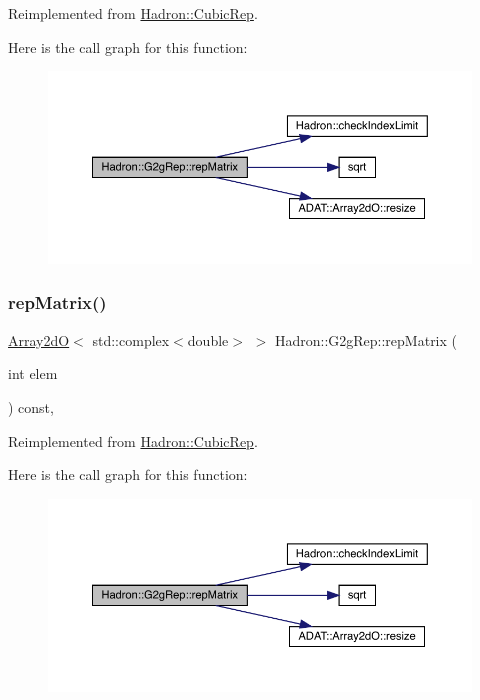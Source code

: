 Reimplemented from \mbox{\hyperlink{structHadron_1_1CubicRep_ac5d7e9e6f4ab1158b5fce3e4ad9e8005}{Hadron\+::\+Cubic\+Rep}}.

Here is the call graph for this function\+:
\nopagebreak
\begin{figure}[H]
\begin{center}
\leavevmode
\includegraphics[width=350pt]{d9/d3e/structHadron_1_1G2gRep_af178c31ae966d7c1025673a0889b7f6f_cgraph}
\end{center}
\end{figure}
\mbox{\label{structHadron_1_1G2gRep_af178c31ae966d7c1025673a0889b7f6f}} 
\subsubsection{\texorpdfstring{repMatrix()}{repMatrix()}\hspace{0.1cm}{\footnotesize\ttfamily [2/2]}}
{\footnotesize\ttfamily \mbox{\hyperlink{classADAT_1_1Array2dO}{Array2dO}}$<$ std\+::complex$<$double$>$ $>$ Hadron\+::\+G2g\+Rep\+::rep\+Matrix (\begin{DoxyParamCaption}\item[{int}]{elem }\end{DoxyParamCaption}) const\hspace{0.3cm}{\ttfamily [inline]}, {\ttfamily [virtual]}}



Reimplemented from \mbox{\hyperlink{structHadron_1_1CubicRep_ac5d7e9e6f4ab1158b5fce3e4ad9e8005}{Hadron\+::\+Cubic\+Rep}}.

Here is the call graph for this function\+:
\nopagebreak
\begin{figure}[H]
\begin{center}
\leavevmode
\includegraphics[width=350pt]{d9/d3e/structHadron_1_1G2gRep_af178c31ae966d7c1025673a0889b7f6f_cgraph}
\end{center}
\end{figure}


